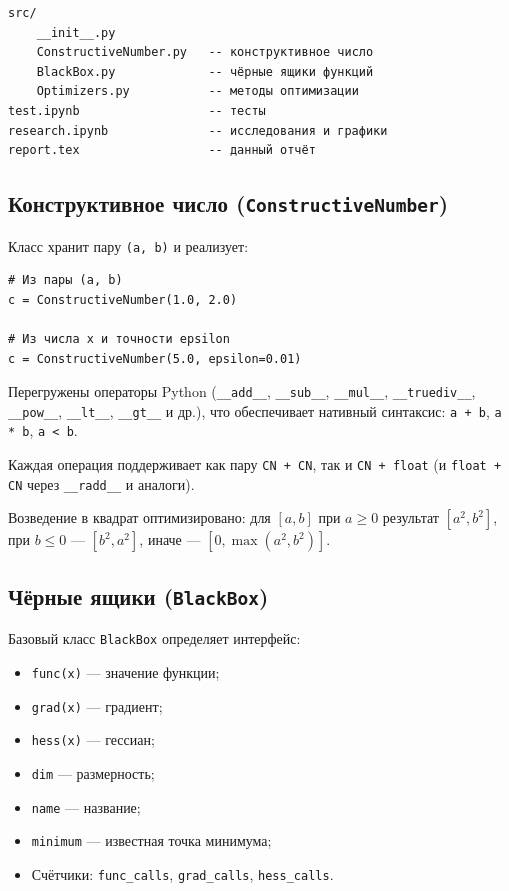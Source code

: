 \documentclass[a4paper, 14pt]{extarticle}
\begin{document}
\begin{verbatim}
src/
    __init__.py
    ConstructiveNumber.py   -- конструктивное число
    BlackBox.py             -- чёрные ящики функций
    Optimizers.py           -- методы оптимизации
test.ipynb                  -- тесты
research.ipynb              -- исследования и графики
report.tex                  -- данный отчёт
\end{verbatim}

\subsection{Конструктивное число (\texttt{ConstructiveNumber})}

Класс хранит пару \texttt{(a, b)} и реализует:

\begin{lstlisting}[style=python, caption={Создание конструктивного числа}]
# Из пары (a, b)
c = ConstructiveNumber(1.0, 2.0)

# Из числа x и точности epsilon
c = ConstructiveNumber(5.0, epsilon=0.01)
\end{lstlisting}

Перегружены операторы Python (\texttt{\_\_add\_\_}, \texttt{\_\_sub\_\_}, \texttt{\_\_mul\_\_}, \texttt{\_\_truediv\_\_}, \texttt{\_\_pow\_\_}, \texttt{\_\_lt\_\_}, \texttt{\_\_gt\_\_} и др.), что обеспечивает нативный синтаксис: \texttt{a + b}, \texttt{a * b}, \texttt{a < b}.

Каждая операция поддерживает как пару \texttt{CN + CN}, так и \texttt{CN + float} (и \texttt{float + CN} через \texttt{\_\_radd\_\_} и аналоги).

Возведение в квадрат оптимизировано: для $[a, b]$ при $a \ge 0$ результат $[a^2, b^2]$, при $b \le 0$ --- $[b^2, a^2]$, иначе --- $[0, \max(a^2, b^2)]$.

\subsection{Чёрные ящики (\texttt{BlackBox})}

Базовый класс \texttt{BlackBox} определяет интерфейс:
\begin{itemize}
    \item \texttt{func(x)} --- значение функции;
    \item \texttt{grad(x)} --- градиент;
    \item \texttt{hess(x)} --- гессиан;
    \item \texttt{dim} --- размерность;
    \item \texttt{name} --- название;
    \item \texttt{minimum} --- известная точка минимума;
    \item Счётчики: \texttt{func\_calls}, \texttt{grad\_calls}, \texttt{hess\_calls}.
\end{itemize}
\end{document}
